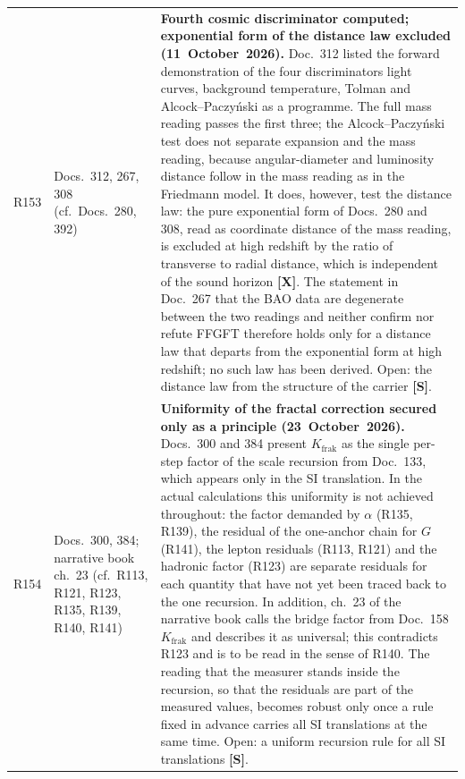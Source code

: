 \begin{longtable}{@{}p{0.9cm}p{3.1cm}p{10.2cm}@{}}
R153 & Docs.~312, 267, 308 (cf.\ Docs.~280, 392) & \textbf{Fourth cosmic discriminator computed; exponential form of the distance law excluded (11~October~2026).} Doc.~312 listed the forward demonstration of the four discriminators light curves, background temperature, Tolman and Alcock--Paczyński as a programme. The full mass reading passes the first three; the Alcock--Paczyński test does not separate expansion and the mass reading, because angular-diameter and luminosity distance follow in the mass reading as in the Friedmann model. It does, however, test the distance law: the pure exponential form of Docs.~280 and 308, read as coordinate distance of the mass reading, is excluded at high redshift by the ratio of transverse to radial distance, which is independent of the sound horizon \textbf{[X]}. The statement in Doc.~267 that the BAO data are degenerate between the two readings and neither confirm nor refute FFGFT therefore holds only for a distance law that departs from the exponential form at high redshift; no such law has been derived. Open: the distance law from the structure of the carrier \textbf{[S]}. \\
R154 & Docs.~300, 384; narrative book ch.~23 (cf.\ R113, R121, R123, R135, R139, R140, R141) & \textbf{Uniformity of the fractal correction secured only as a principle (23~October~2026).} Docs.~300 and 384 present $K_{\mathrm{frak}}$ as the single per-step factor of the scale recursion from Doc.~133, which appears only in the SI translation. In the actual calculations this uniformity is not achieved throughout: the factor demanded by $\alpha$ (R135, R139), the residual of the one-anchor chain for $G$ (R141), the lepton residuals (R113, R121) and the hadronic factor (R123) are separate residuals for each quantity that have not yet been traced back to the one recursion. In addition, ch.~23 of the narrative book calls the bridge factor from Doc.~158 $K_{\mathrm{frak}}$ and describes it as universal; this contradicts R123 and is to be read in the sense of R140. The reading that the measurer stands inside the recursion, so that the residuals are part of the measured values, becomes robust only once a rule fixed in advance carries all SI translations at the same time. Open: a uniform recursion rule for all SI translations \textbf{[S]}. \\

\end{longtable}
